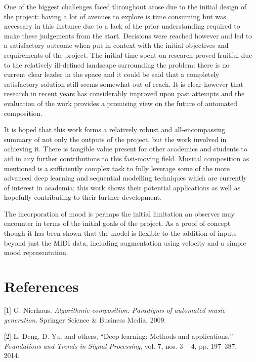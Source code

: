 \documentclass[12pt,]{article}
\begin{document}
One of the biggest challenges faced throughout arose due to the initial
design of the project: having a lot of avenues to explore is time
consuming but was necessary in this instance due to a lack of the prior
understanding required to make these judgements from the start.
Decisions were reached however and led to a satisfactory outcome when
put in context with the initial objectives and requirements of the
project. The initial time spent on research proved fruitful due to the
relatively ill-defined landscape surrounding the problem: there is no
current clear leader in the space and it could be said that a completely
satisfactory solution still seems somewhat out of reach. It is clear
however that research in recent years has considerably improved upon
past attempts and the evaluation of the work provides a promising view
on the future of automated composition.

It is hoped that this work forms a relatively robust and
all-encompassing summary of not only the outputs of the project, but the
work involved in achieving it. There is tangible value present for other
academics and students to aid in any further contributions to this
fast-moving field. Musical composition as mentioned is a sufficiently
complex task to fully leverage some of the more advanced deep learning
and sequential modelling techniques which are currently of interest in
academia; this work shows their potential applications as well as
hopefully contributing to their further development.

The incorporation of mood is perhaps the initial limitation an observer
may encounter in terms of the initial goals of the project. As a proof
of concept though it has been shown that the model is flexible to the
addition of inputs beyond just the MIDI data, including augmentation
using velocity and a simple mood representation.

\hypertarget{references}{%
\section*{References}\label{references}}

\hypertarget{refs}{}
\leavevmode\hypertarget{ref-nierhaus2009algorithmic}{}%
{[}1{]} G. Nierhaus, \emph{Algorithmic composition: Paradigms of
automated music generation}. Springer Science \& Business Media, 2009.

\leavevmode\hypertarget{ref-deng2014deep}{}%
{[}2{]} L. Deng, D. Yu, and others, ``Deep learning: Methods and
applications,'' \emph{Foundations and Trends in Signal Processing}, vol.
7, nos. 3 -- 4, pp. 197--387, 2014.
\end{document}
